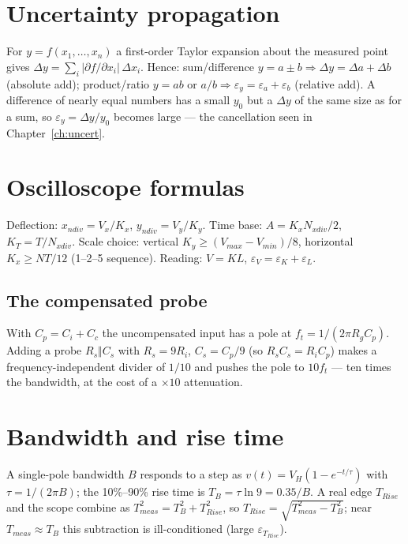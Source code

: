 \documentclass[11pt,a4paper,oneside]{book}
\begin{document}
\chapter{Uncertainty propagation}\label{app:prop}
For $y=f(x_1,\dots,x_n)$ a first-order Taylor expansion about the measured point
gives $\Delta y=\sum_i\bigl|\partial f/\partial x_i\bigr|\,\Delta x_i$. Hence:
sum/difference $y=a\pm b\Rightarrow\Delta y=\Delta a+\Delta b$ (absolute add);
product/ratio $y=ab$ or $a/b\Rightarrow\varepsilon_y=\varepsilon_a+\varepsilon_b$
(relative add). A difference of nearly equal numbers has a small $y_0$ but a
$\Delta y$ of the same size as for a sum, so $\varepsilon_y=\Delta y/y_0$ becomes
large --- the cancellation seen in Chapter~\ref{ch:uncert}.

\chapter{Oscilloscope formulas}\label{app:scope}
Deflection: $x_{ndiv}=V_x/K_x$, $y_{ndiv}=V_y/K_y$. Time base:
$A=K_xN_{xdiv}/2$, $K_T=T/N_{xdiv}$. Scale choice: vertical
$K_y\ge(V_{max}-V_{min})/8$, horizontal $K_x\ge NT/12$ (1--2--5 sequence).
Reading: $V=KL$, $\varepsilon_V=\varepsilon_K+\varepsilon_L$.

\section{The compensated probe}\label{app:probe}
With $C_p=C_i+C_c$ the uncompensated input has a pole at
$f_t=1/(2\pi R_g C_p)$. Adding a probe $R_s\Vert C_s$ with $R_s=9R_i$,
$C_s=C_p/9$ (so $R_sC_s=R_iC_p$) makes a frequency-independent divider of $1/10$
and pushes the pole to $10f_t$ --- ten times the bandwidth, at the cost of a
$\times10$ attenuation.

\chapter{Bandwidth and rise time}\label{app:rise}
A single-pole bandwidth $B$ responds to a step as
$v(t)=V_H(1-e^{-t/\tau})$ with $\tau=1/(2\pi B)$; the 10\%--90\% rise time is
$T_B=\tau\ln 9=0.35/B$. A real edge $T_{Rise}$ and the scope combine as
$T_{meas}^2=T_B^2+T_{Rise}^2$, so $T_{Rise}=\sqrt{T_{meas}^2-T_B^2}$; near
$T_{meas}\approx T_B$ this subtraction is ill-conditioned (large
$\varepsilon_{T_{Rise}}$).
\end{document}
